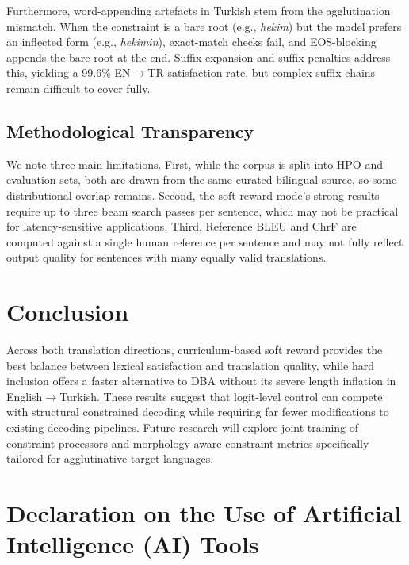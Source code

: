 \documentclass{CUP-JNL-NLP}
\begin{document}
Furthermore, word-appending artefacts in Turkish stem from the agglutination
mismatch. When the constraint is a bare root (e.g., \emph{hekim}) but the model
prefers an inflected form (e.g., \emph{hekimin}), exact-match checks fail, and
EOS-blocking appends the bare root at the end. Suffix expansion and suffix penalties
address this, yielding a 99.6\% EN$\rightarrow$TR satisfaction rate, but complex
suffix chains remain difficult to cover fully.

\subsection{Methodological Transparency}

We note three main limitations. First, while the corpus is split into HPO and
evaluation sets, both are drawn from the same curated bilingual source, so some
distributional overlap remains. Second, the soft reward mode's strong results require
up to three beam search passes per sentence, which may not be practical for
latency-sensitive applications. Third, Reference BLEU and ChrF are computed against a
single human reference per sentence and may not fully reflect output quality for
sentences with many equally valid translations.


\section{Conclusion}

Across both translation directions, curriculum-based soft reward provides the best
balance between lexical satisfaction and translation quality, while hard inclusion
offers a faster alternative to DBA without its severe length inflation in
English$\rightarrow$Turkish. These results suggest that logit-level control can
compete with structural constrained decoding while requiring far fewer modifications
to existing decoding pipelines. Future research will explore joint training of
constraint processors and morphology-aware constraint metrics specifically tailored
for agglutinative target languages.



\section*{Declaration on the Use of Artificial Intelligence (AI) Tools}
\end{document}
